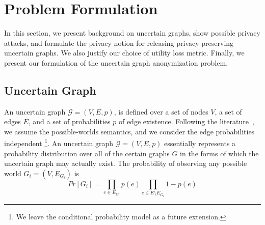 \section{Problem Formulation}
\label{sec:notation}

In this section, we present background on uncertain graphs, show possible privacy attacks, and formulate the privacy notion for releasing privacy-preserving uncertain graphs. We also justify our choice of utility loss metric. Finally, we present our formulation of the uncertain graph anonymization problem. 

\subsection{Uncertain Graph}
An uncertain graph $\mathcal{G}=(V,E,\mathit{p})$, is defined over a set of nodes $V$, a set of edges $E$, and a set of probabilities $\mathit{p}$ of edge existence. Following the literature~\cite{Potamias_K_2010,Zhao_Detecting_2014,Colbourn_Colbourn_1987}, we assume the possible-worlds semantics, and we consider the edge probabilities independent \footnote{We leave the conditional probability model as a future extension.}. An uncertain graph $\mathcal{G}=(V,E,\mathit{p})$ essentially represents a probability distribution over all of the certain graphs $G$ in the forms of which the uncertain graph may actually exist. 
The probability of observing any possible world $G_i=(V,E_{G_i})$ is    
\begin{equation*}
    Pr[G_i]=\prod_{e \in E_{G_i}} {\mathit{p}(e)} \prod_{e \in E \setminus E_{G_i}} 1-\mathit{p}(e)
\end{equation*}

